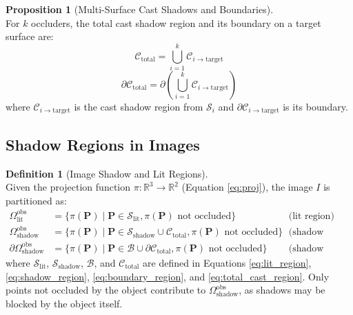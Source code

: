 \documentclass[12pt]{article}
\newcommand{\vect}[1]{\bm{#1}}
\theoremstyle{definition}
\newtheorem{definition}{Definition}[subsection]
\newtheorem{proposition}{Proposition}[subsection]
\begin{document}
\begin{proposition}[Multi-Surface Cast Shadows and Boundaries] \label{prop:multi_cast} ~\\
For $k$ occluders, the total cast shadow region and its boundary on a target surface are:
\begin{equation}
\boxed{\mathcal{C}_{\text{total}} = \bigcup_{i=1}^k \mathcal{C}_{i \to \text{target}} \label{eq:total_cast_region}}
\end{equation}
\begin{equation}
\boxed{\partial\mathcal{C}_{\text{total}} = \partial (\bigcup_{i=1}^k \mathcal{C}_{i \to \text{target}}) \label{eq:total_cast_boundary}}
\end{equation}
where $\mathcal{C}_{i \to \text{target}}$ is the cast shadow region from $\mathcal{S}_i$ and $\partial\mathcal{C}_{i \to \text{target}}$ is its boundary.
\end{proposition}

\subsection{Shadow Regions in Images} \label{sec:shadow_in_image}

\begin{definition}[Image Shadow and Lit Regions] \label{def:image_shadow_regions} ~\\
Given the projection function $\pi: \mathbb{R}^3 \to \mathbb{R}^2$ (Equation \eqref{eq:proj}), the image $I$ is partitioned as:
\begin{align}
\Omega_{\text{lit}}^{\text{obs}} &= \{\pi(\vect{P}) \mid \vect{P} \in \mathcal{S}_{\text{lit}}, \pi(\vect{P}) \text{ not occluded}\} && \text{(lit region)} \label{eq:image_lit} \\
\Omega_{\text{shadow}}^{\text{obs}} &= \{\pi(\vect{P}) \mid \vect{P} \in \mathcal{S}_{\text{shadow}} \cup \mathcal{C}_{\text{total}}, \pi(\vect{P}) \text{ not occluded}\} && \text{(shadow region)} \label{eq:image_shadow} \\
\partial\Omega_{\text{shadow}}^{\text{obs}} &= \{\pi(\vect{P}) \mid \vect{P} \in \mathcal{B} \cup \partial\mathcal{C}_{\text{total}}, \pi(\vect{P}) \text{ not occluded}\} && \text{(shadow boundary)} \label{eq:image_boundary}
\end{align}
where $\mathcal{S}_{\text{lit}}$, $\mathcal{S}_{\text{shadow}}$, $\mathcal{B}$, and $\mathcal{C}_{\text{total}}$ are defined in Equations \eqref{eq:lit_region}, \eqref{eq:shadow_region}, \eqref{eq:boundary_region}, and \eqref{eq:total_cast_region}. Only points not occluded by the object contribute to $\Omega_{\text{shadow}}^{\text{obs}}$, as shadows may be blocked by the object itself.
\end{definition}
\end{document}

